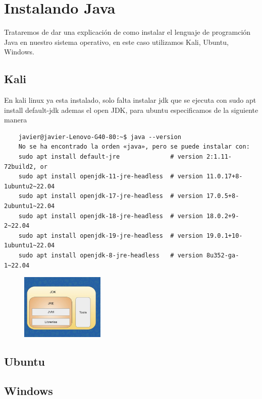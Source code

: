 \chapter{Instalando Java}
Trataremos de dar una explicaci\'on de como instalar el lenguaje de programci\'on Java en nuestro sistema operativo, en este caso 
utilizamos Kali, Ubuntu, Windows.

\section{Kali}
En kali linux ya esta instalado, solo falta instalar jdk que se ejecuta con sudo apt install default-jdk ademas el open JDK, para ubuntu especificamos de la siguiente manera
\begin{verbatim}
    javier@javier-Lenovo-G40-80:~$ java --version
    No se ha encontrado la orden «java», pero se puede instalar con:
    sudo apt install default-jre              # version 2:1.11-72build2, or
    sudo apt install openjdk-11-jre-headless  # version 11.0.17+8-1ubuntu2~22.04
    sudo apt install openjdk-17-jre-headless  # version 17.0.5+8-2ubuntu1~22.04
    sudo apt install openjdk-18-jre-headless  # version 18.0.2+9-2~22.04
    sudo apt install openjdk-19-jre-headless  # version 19.0.1+10-1ubuntu1~22.04
    sudo apt install openjdk-8-jre-headless   # version 8u352-ga-1~22.04
\end{verbatim}

\begin{figure}[h!]
    \center
    \begin{minipage}{5cm}
    \includegraphics[width=4cm]{Develop/Languages/Java/images/Captura desde 2023-02-08 00-25-57.png}
    \end{minipage}
  \end{figure}


\section{Ubuntu}
\section{Windows}